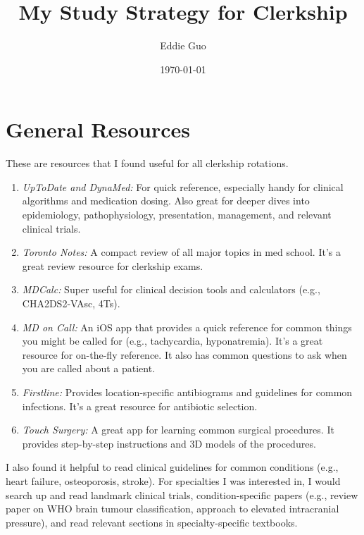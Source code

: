 \documentclass{article}
\begin{document}
\title{My Study Strategy for Clerkship}
\author{Eddie Guo}
\date{\today}

\maketitle

\section*{General Resources}
These are resources that I found useful for all clerkship rotations.
\begin{enumerate}
    \item \textit{UpToDate and DynaMed:} For quick reference, especially handy for clinical algorithms and medication dosing. Also great for deeper dives into epidemiology, pathophysiology, presentation, management, and relevant clinical trials.
    \item \textit{Toronto Notes:} A compact review of all major topics in med school. It's a great review resource for clerkship exams.
    \item \textit{MDCalc:} Super useful for clinical decision tools and calculators (e.g., CHA2DS2-VAsc, 4Ts).
    \item \textit{MD on Call:} An iOS app that provides a quick reference for common things you might be called for (e.g., tachycardia, hyponatremia). It's a great resource for on-the-fly reference. It also has common questions to ask when you are called about a patient.
    \item \textit{Firstline:} Provides location-specific antibiograms and guidelines for common infections. It's a great resource for antibiotic selection.
    \item \textit{Touch Surgery:} A great app for learning common surgical procedures. It provides step-by-step instructions and 3D models of the procedures.
\end{enumerate}

I also found it helpful to read clinical guidelines for common conditions (e.g., heart failure, osteoporosis, stroke). For specialties I was interested in, I would search up and read landmark clinical trials, condition-specific papers (e.g., review paper on WHO brain tumour classification, approach to elevated intracranial pressure), and read relevant sections in specialty-specific textbooks. \vspace{1em}
\end{document}

